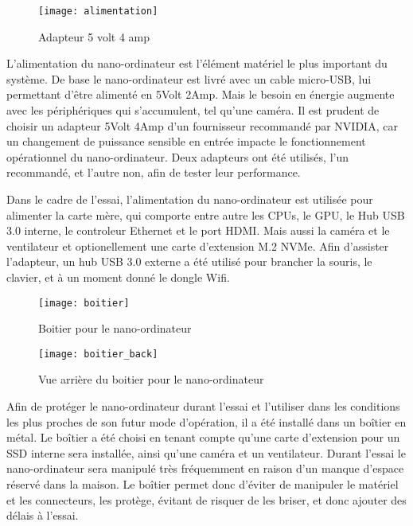 \begin{figure}
    \centering
    \texttt{[image: alimentation]}
    \caption{Adapteur 5 volt 4 amp}
    \label{fig:alimenation}
\end{figure}
\par L'alimentation du nano-ordinateur est l'élément matériel le plus important du système. De base le nano-ordinateur est livré avec un cable micro-USB, lui permettant d'être alimenté en 5Volt 2Amp. Mais le besoin en énergie augmente avec les périphériques qui s'accumulent, tel qu'une caméra. Il est prudent de choisir un adapteur 5Volt 4Amp d'un fournisseur recommandé par NVIDIA, car un changement de puissance sensible en entrée impacte le fonctionnement opérationnel du nano-ordinateur. Deux adapteurs ont été utilisés, l'un recommandé, et l'autre non, afin de tester leur performance. 
\par Dans le cadre de l'essai, l'alimentation du nano-ordinateur est utilisée pour alimenter la carte mère, qui comporte entre autre les CPUs, le GPU, le Hub USB 3.0 interne, le controleur Ethernet et le port HDMI. Mais aussi la caméra et  le ventilateur et optionellement une carte d'extension M.2 NVMe. Afin d'assister l'adapteur, un hub USB 3.0 externe a été utilisé pour brancher la souris, le clavier, et à un moment donné le dongle Wifi.
\begin{figure}
    \centering
    \texttt{[image: boitier]}
    \caption{Boitier pour le nano-ordinateur}
    \label{fig:boitier}
\end{figure}
\begin{figure}
    \centering
    \texttt{[image: boitier\_back]}
    \caption{Vue arrière du boitier pour le nano-ordinateur}
    \label{fig:boitier_arriere}
\end{figure}
\par Afin de protéger le nano-ordinateur durant l'essai et l'utiliser dans les conditions les plus proches de son futur mode d'opération, il a été installé dans un boîtier en métal. Le boîtier a été choisi en tenant compte qu'une carte d'extension pour un SSD interne sera installée, ainsi qu'une caméra et un ventilateur. Durant l'essai le nano-ordinateur sera manipulé très fréquemment en raison d'un manque d'espace réservé dans la maison. Le boîtier permet donc d'éviter de manipuler le matériel et les connecteurs, les protège, évitant de risquer de les briser, et donc ajouter des délais à l'essai. 
